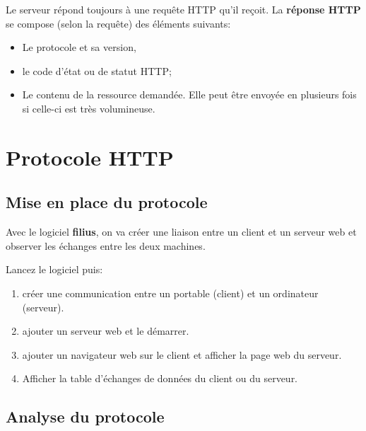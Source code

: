 \documentclass[12pt,a4paper]{article}
\begin{document}
\noindent Le serveur répond toujours à une requête HTTP qu'il reçoit. La \textbf{réponse HTTP} se compose (selon la requête) des éléments suivants:

\begin{itemize}
\item Le protocole et sa version,
\item le code d'état ou de statut HTTP;
\item Le contenu de la ressource demandée. Elle peut être envoyée en plusieurs fois si celle-ci est très volumineuse.
\end{itemize}


\newpage
\section{Protocole HTTP}

\subsection*{Mise en place du protocole}
\noindent Avec le logiciel \textbf{filius}, on va créer une liaison entre un client et un serveur web et observer les échanges entre les deux machines.\medskip

Lancez le logiciel puis:
\begin{enumerate}
\item créer une communication entre un portable (client) et un ordinateur (serveur).
\item ajouter un serveur web et le démarrer.
\item ajouter un navigateur web sur le client et afficher la page web du serveur.
\item Afficher la table d'échanges de données du client ou du serveur.
\end{enumerate}


\subsection*{Analyse du protocole}
\end{document}
